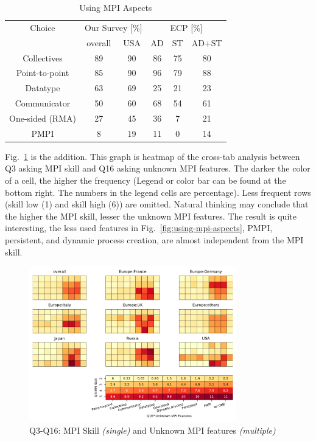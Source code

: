 \documentclass[conference,10pt,letterpaper]{IEEEtran}
\begin{document}
\begin{table}[htb]%
\begin{center}%
\caption{Using MPI Aspects}\label{tab:using-mpi-aspects}%
\begin{tabular}{c||c|c||c|c|c}%
\hline%
Choice & \multicolumn{2}{c||}{Our Survey [\%]} &
\multicolumn{3}{c}{ECP [\%]} \\
\cline{2-6}%
 & overall & USA & AD & ST & AD+ST \\
\hline%
Collectives & 89 & 90 & 86 & 75 & 80 \\
Point-to-point & 85 & 90 & 96 & 79 & 88 \\
Datatype & 63 & 69 & 25 & 21 & 23 \\
Communicator & 50 & 60 & 68 & 54 & 61 \\
One-sided (RMA) & 27 & 45 & 36 & 7 & 21 \\
PMPI & 8 & 19 & 11 & 0 & 14 \\
\hline%
\end{tabular}%
\end{center}%
\end{table}%

Fig.~\ref{fig:skill-and-aspects} is the addition. This graph is
heatmap of the cross-tab analysis between Q3 asking MPI skill and Q16
asking unknown MPI features. The darker the color of a cell, the
higher the frequency (Legend or color bar can be found at the bottom
right. The numbers in the legend cells are percentage). Less frequent
rows (skill low (1) and  
skill high (6)) are omitted. Natural thinking may conclude
that the higher the MPI skill, lesser the unknown MPI features. The
result is quite interesting, the less used features in
Fig.~\ref{fig:using-mpi-aspects}, PMPI, persistent, and dynamic process
creation, are almost independent from the MPI skill.

  
\begin{figure}[htb]
\begin{center}
\includegraphics[width=9cm]{Figs/Q3-Q16.pdf}
\caption{Q3-Q16: MPI Skill {\it(single)} and Unknown MPI features {\it(multiple)}}
\label{fig:skill-and-aspects}
\end{center}
\end{figure}
\end{document}
